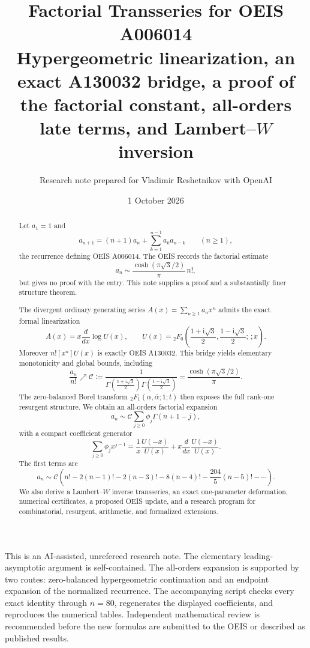 \documentclass[11pt,a4paper]{article}
\title{\vspace{-1.5em}\textbf{Factorial Transseries for OEIS A006014}\\[0.35em]
\large Hypergeometric linearization, an exact A130032 bridge, a proof of the factorial constant, all-orders late terms, and Lambert--\(W\) inversion}
\author{Research note prepared for Vladimir Reshetnikov with OpenAI}
\date{1 October 2026}
\theoremstyle{definition}
\theoremstyle{remark}
\newcommand{\ii}{\mathrm{i}}
\newcommand{\constC}{\mathcal{C}}
\begin{document}
\maketitle

\begin{abstract}
Let \(a_1=1\) and
\[
 a_{n+1}=(n+1)a_n+\sum_{k=1}^{n-1}a_k a_{n-k}
 \qquad(n\ge 1),
\]
the recurrence defining OEIS A006014.  The OEIS records the factorial estimate
\[
 a_n\sim \frac{\cosh(\pi\sqrt3/2)}{\pi}\,n!,
\]
but gives no proof with the entry.  This note supplies a proof and a substantially finer structure theorem.

The divergent ordinary generating series \(A(x)=\sum_{n\ge1}a_nx^n\) admits the exact formal linearization
\[
 A(x)=x\frac{d}{dx}\log U(x),\qquad
 U(x)={}_2F_0\!\left(\frac{1+\ii\sqrt3}{2},\frac{1-\ii\sqrt3}{2};\,;x\right).
\]
Moreover \(n![x^n]U(x)\) is exactly OEIS A130032.  This bridge yields elementary monotonicity and global bounds, including
\[
 \frac{a_n}{n!}\nearrow
 \constC:=\frac{1}{\Gamma(\frac{1+\ii\sqrt3}{2})
                         \Gamma(\frac{1-\ii\sqrt3}{2})}
 =\frac{\cosh(\pi\sqrt3/2)}{\pi}.
\]
The zero-balanced Borel transform \({}_2F_1(\alpha,\bar\alpha;1;t)\) then exposes the full rank-one resurgent structure.  We obtain an all-orders factorial expansion
\[
 a_n\sim \constC\sum_{j\ge0}\phi_j\Gamma(n+1-j),
\]
with a compact coefficient generator
\[
 \sum_{j\ge0}\phi_jx^{j-1}
 =\frac{1}{x}\frac{U(-x)}{U(x)}
  +x\frac{d}{dx}\frac{U(-x)}{U(x)}.
\]
The first terms are
\[
 a_n\sim\constC\left(n!-2(n-1)!-2(n-3)!-8(n-4)!-\frac{204}{5}(n-5)!-\cdots\right).
\]
We also derive a Lambert--\(W\) inverse transseries, an exact one-parameter deformation, numerical certificates, a proposed OEIS update, and a research program for combinatorial, resurgent, arithmetic, and formalized extensions.
\end{abstract}

\begin{statusbox}
This is an AI-assisted, unrefereed research note.  The elementary leading-asymptotic argument is self-contained.  The all-orders expansion is supported by two routes: zero-balanced hypergeometric continuation and an endpoint expansion of the normalized recurrence.  The accompanying script checks every exact identity through \(n=80\), regenerates the displayed coefficients, and reproduces the numerical tables.  Independent mathematical review is recommended before the new formulas are submitted to the OEIS or described as published results.
\end{statusbox}
\end{document}
